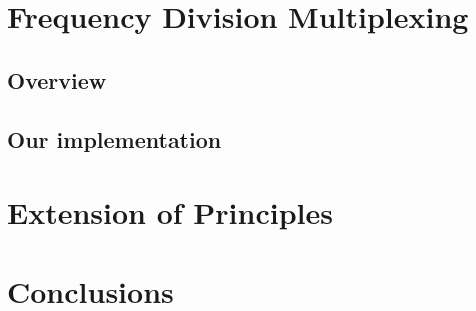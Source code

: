 \documentclass[12pt]{article}
\begin{document}
\section{Frequency Division Multiplexing}

\subsection{Overview}


\subsection{Our implementation}


\section{Extension of Principles}


\section{Conclusions}
\end{document}
